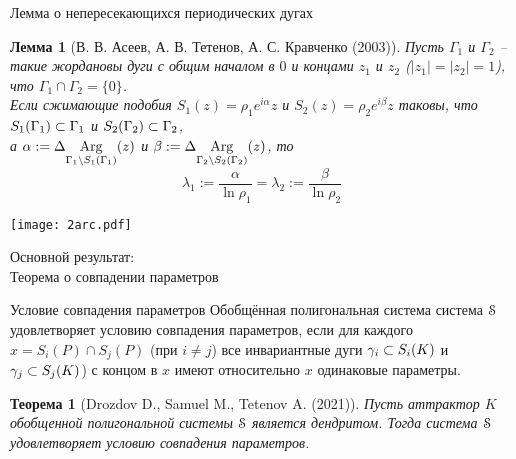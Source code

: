 \documentclass[aspectratio=1610, 10pt, notheorems]{beamer}
\newtheorem{theorem}     {Теорема}
\newtheorem{lemma}       {Лемма}
\begin{document}
\begin{frame}{Лемма о непересекающихся периодических дугах}
\begin{lemma}[В. В. Асеев, А. В. Тетенов, А. С. Кравченко (2003)]
Пусть $\Gamma_1$ и $\Gamma_2$ -- такие жордановы дуги с общим началом в $0$ и  концами $z_1$ и $z_2$ ($|z_1|=|z_2|=1$), что $\Gamma_1\cap\Gamma_2=\{0\}$.\\
Если сжимающие подобия $S_1(z)=\rho_1 e^{i\alpha}z$ и $S_2(z)=\rho_2 e^{i\beta}z$ таковы, что $S_1(\Gamma_1)\subset\Gamma_1$ и $S_2(\Gamma_2)\subset\Gamma_2$,\\ 
а $\alpha:=\Delta\underset{{\Gamma_1\setminus S_1(\Gamma_1)}}{\mathrm {Arg}}(z)$ и $\beta:=\Delta\underset{{\Gamma_2\setminus S_2(\Gamma_2)}}{\mathrm {Arg}}(z)$, то
$$\lambda_1:=\dfrac{\alpha}{\ln\rho_1} = \lambda_2:=\dfrac{\beta}{\ln\rho_2}$$
\end{lemma}

\end{frame}

\begin{frame}{}
\texttt{[image: 2arc.pdf]}
\end{frame}



\begin{frame}{Основной результат:\\Теорема о совпадении параметров}
\begin{block}{Условие совпадения параметров}
Обобщённая полигональная система система ${\EuScript S}$ удовлетворяет условию совпадения параметров, если для каждого $x=S_i(P)\cap S_j(P)$ (при $i\neq j$) все инвариантные дуги $\gamma_i\subset S_i(K)$ и $\gamma_j\subset S_j(K)$) с концом в $x$ имеют относительно $x$ одинаковые параметры.
\end{block}
\begin{theorem}[Drozdov D., Samuel M., Tetenov A. (2021)]
Пусть аттрактор $K$ обобщенной полигональной системы ${\EuScript S}$ является дендритом. 
Тогда система ${\EuScript S}$ удовлетворяет условию совпадения параметров.
\end{theorem}
\end{frame}
\end{document}
